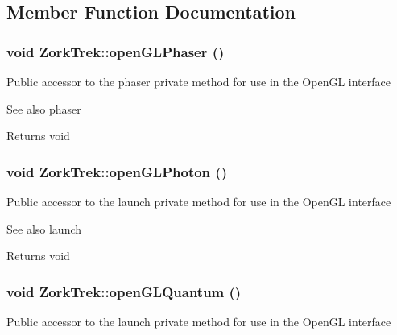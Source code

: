 \subsection{Member Function Documentation}
\hypertarget{classZorkTrek_ad099def5ec9fec3dfc2fccbbfc68f3bf}{
\subsubsection[{openGLPhaser}]{\setlength{\rightskip}{0pt plus 5cm}void ZorkTrek::openGLPhaser ()}}
\label{d6/df9/classZorkTrek_ad099def5ec9fec3dfc2fccbbfc68f3bf}
Public accessor to the phaser private method for use in the OpenGL interface

\begin{DoxySeeAlso}{See also}
phaser
\end{DoxySeeAlso}
\begin{DoxyReturn}{Returns}
void 
\end{DoxyReturn}
\hypertarget{classZorkTrek_acd517289066e25a8541bbe74ac2dc74e}{
\subsubsection[{openGLPhoton}]{\setlength{\rightskip}{0pt plus 5cm}void ZorkTrek::openGLPhoton ()}}
\label{d6/df9/classZorkTrek_acd517289066e25a8541bbe74ac2dc74e}
Public accessor to the launch private method for use in the OpenGL interface

\begin{DoxySeeAlso}{See also}
launch
\end{DoxySeeAlso}
\begin{DoxyReturn}{Returns}
void 
\end{DoxyReturn}
\hypertarget{classZorkTrek_a9387185224b8d78b824a78b0f1a4e3ab}{
\subsubsection[{openGLQuantum}]{\setlength{\rightskip}{0pt plus 5cm}void ZorkTrek::openGLQuantum ()}}
\label{d6/df9/classZorkTrek_a9387185224b8d78b824a78b0f1a4e3ab}
Public accessor to the launch private method for use in the OpenGL interface

